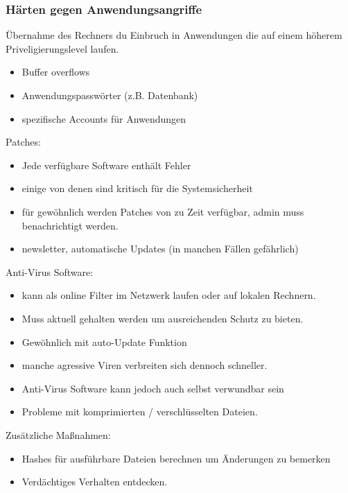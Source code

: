 \documentclass{article} %
\begin{document}
\subsubsection{Härten gegen Anwendungsangriffe}
Übernahme des Rechners du Einbruch in Anwendungen die auf einem höherem Priveligierungslevel laufen.
\begin{itemize}
	\item Buffer overflows
    \item Anwendungspasswörter (z.B. Datenbank)
    \item spezifische Accounts für Anwendungen
\end{itemize}
Patches:
\begin{itemize}
	\item Jede verfügbare Software enthält Fehler
    \item einige von denen sind kritisch für die Systemsicherheit
    \item für gewöhnlich werden Patches von zu Zeit verfügbar, admin muss benachrichtigt werden.
    \item newsletter, automatische Updates (in manchen Fällen gefährlich)
\end{itemize}
Anti-Virus Software:
\begin{itemize}
	\item kann als online Filter im Netzwerk laufen oder auf lokalen Rechnern.
    \item Muss aktuell gehalten werden um ausreichenden Schutz zu bieten.
    \item Gewöhnlich mit auto-Update Funktion
    \item manche agressive Viren verbreiten sich dennoch schneller.
    \item Anti-Virus Software kann jedoch auch selbst verwundbar sein
    \item Probleme mit komprimierten / verschlüsselten Dateien.
\end{itemize}
Zusätzliche Maßnahmen:
\begin{itemize}
	\item Hashes für ausführbare Dateien berechnen um Änderungen zu bemerken
    \item Verdächtiges Verhalten entdecken.
\end{itemize}
\end{document}

